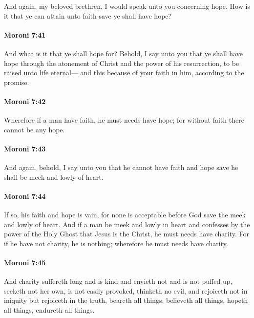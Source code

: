 			And again, my beloved brethren, I would speak unto you concerning hope.
			How is it that ye can attain unto faith save ye shall have hope?

		\paragraph{Moroni 7:41} %
			\label{MORONI-7-41}

			And what is it that ye shall hope for?
			Behold, I say unto you that ye shall have hope
			through the atonement of Christ and the power of his resurrection,
			to be raised unto life eternal---
			and this because of your faith in him, according to the promise.

		\paragraph{Moroni 7:42} %
			\label{MORONI-7-42}

			Wherefore if a man have faith, he must needs have hope;
			for without faith there cannot be any hope.

		\paragraph{Moroni 7:43} %
			\label{MORONI-7-43}

			And again, behold, I say unto you that he cannot have faith and hope
			save he shall be meek and lowly of heart.

		\paragraph{Moroni 7:44} %
			\label{MORONI-7-44}

			If so, his faith and hope is vain,
			for none is acceptable before God
			save the meek and lowly of heart.
			And if a man be meek and lowly in heart
			and confesses by the power of the Holy Ghost
			that Jesus is the Christ,
			he must needs have charity.
			For if he have not charity, he is nothing;
			wherefore he must needs have charity.

		\paragraph{Moroni 7:45} %
			\label{MORONI-7-45}

			And charity suffereth long
			and is kind and envieth not
			and is not puffed up,
			seeketh not her own,
			is not easily provoked,
			thinketh no evil,
			and rejoiceth not in iniquity
			but rejoiceth in the truth,
			beareth all things,
			believeth all things,
			hopeth all things,
			endureth all things.

